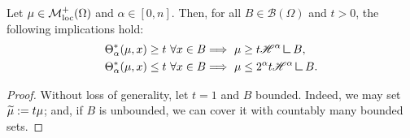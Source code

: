 \begin{theorem} \label{thm:alpha_density}
Let $\mu \in \mathcal{M}^{+}_{\rm loc}(\Omega)$ and $\alpha \in [0, n]$. Then, for all $B \in \mathcal{B}(\Omega)$ and $t > 0$, the following implications hold:
\begin{align}
\Theta^{*}_{\alpha}(\mu, x) \ge t \ \forall x \in B & \Longrightarrow \ \mu \ge t \Haus{\alpha} \res B, \label{eq:lower_bound_density} \\
\Theta^{*}_{\alpha}(\mu, x) \le t \ \forall x \in B & \Longrightarrow \ \mu \le 2^{\alpha} t \Haus{\alpha} \res B. \label{eq:upper_bound_density}
\end{align}
\end{theorem}
\begin{proof}
Without loss of generality, let $t = 1$ and $B$ bounded. Indeed, we may set $\widetilde{ \mu} := t \mu$; and, if $B$ is unbounded, we can cover it with countably many bounded sets.

\smallskip


\end{proof}
